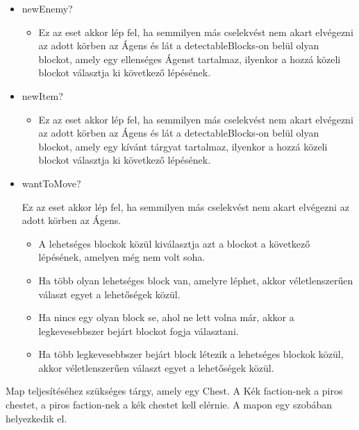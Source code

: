 \begin{itemize}
    \item newEnemy?

    \begin{itemize}
        \item Ez az eset akkor lép fel, ha semmilyen más cselekvést nem akart elvégezni az adott körben az Ágens és lát a detectableBlocks-on belül olyan blockot,
            amely egy ellenséges Ágenst tartalmaz, ilyenkor a hozzá közeli blockot választja ki következő lépésének.
    \end{itemize}

    \item newItem?

    \begin{itemize}
        \item Ez az eset akkor lép fel, ha semmilyen más cselekvést nem akart elvégezni az adott körben az Ágens és lát a detectableBlocks-on belül olyan blockot,
        amely egy kívánt tárgyat tartalmaz, ilyenkor a hozzá közeli blockot választja ki következő lépésének.
    \end{itemize}

    \item wantToMove?
    
    Ez az eset akkor lép fel, ha semmilyen más cselekvést nem akart elvégezni az adott körben az Ágens.

    \begin{itemize}
        \item A lehetséges blockok közül kiválasztja azt a blockot a következő lépésének, amelyen még nem volt soha.
        \item Ha több olyan lehetséges block van, amelyre léphet, akkor véletlenszerűen választ egyet a lehetőségek közül.
        \item Ha nincs egy olyan block se, ahol ne lett volna már, akkor a legkevesebbszer bejárt blockot fogja választani.
        \item Ha több legkevesebbszer bejárt block létezik a lehetséges blockok közül, akkor véletlenszerűen választ egyet a lehetőségek közül.
    \end{itemize}
\end{itemize}


Map teljesítéséhez szükséges tárgy, amely egy Chest. A Kék faction-nek a piros chestet, a piros faction-nek a kék chestet kell elérnie.
A mapon egy szobában helyezkedik el.


